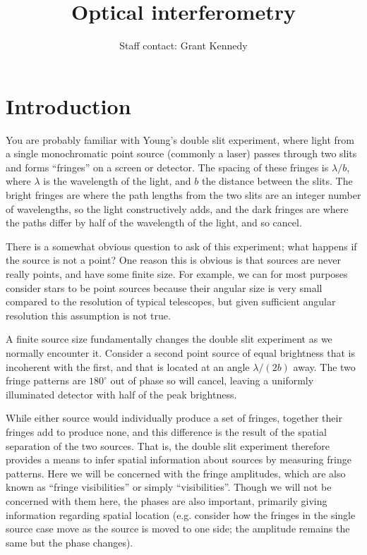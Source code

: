 \documentclass[11pt]{article}
\title{Optical interferometry}
\author{Staff contact: Grant Kennedy}
\date{}                                           %
\begin{document}
\maketitle

\tableofcontents

\section{Introduction}

You are probably familiar with Young's double slit experiment, where light from a single monochromatic point source (commonly a laser) passes through two slits and forms ``fringes'' on a screen or detector. The spacing of these fringes is $\lambda/b$, where $\lambda$ is the wavelength of the light, and $b$ the distance between the slits. The bright fringes are where the path lengths from the two slits are an integer number of wavelengths, so the light constructively adds, and the dark fringes are where the paths differ by half of the wavelength of the light, and so cancel.

There is a somewhat obvious question to ask of this experiment; what happens if the source is not a point? One reason this is obvious is that sources are never really points, and have some finite size. For example, we can for most purposes consider stars to be point sources because their angular size is very small compared to the resolution of typical telescopes, but given sufficient angular resolution this assumption is not true.

A finite source size fundamentally changes the double slit experiment as we normally encounter it. Consider a second point source of equal brightness that is incoherent with the first, and that is located at an angle $\lambda/(2b)$ away. The two fringe patterns are $180^\circ$ out of phase so will cancel, leaving a uniformly illuminated detector with half of the peak brightness.

While either source would individually produce a set of fringes, together their fringes add to produce none, and this difference is the result of the spatial separation of the two sources. That is, the double slit experiment therefore provides a means to infer spatial information about sources by measuring fringe patterns. Here we will be concerned with the fringe amplitudes, which are also known as ``fringe visibilities'' or simply ``visibilities''. Though we will not be concerned with them here, the phases are also important, primarily giving information regarding spatial location (e.g. consider how the fringes in the single source case move as the source is moved to one side; the amplitude remains the same but the phase changes).
\end{document}
